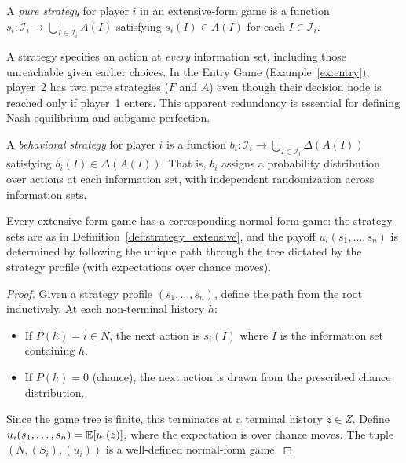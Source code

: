 \documentclass[11pt,a4paper]{article}
\begin{document}
\begin{definition}
\label{def:strategy_extensive}
A \emph{pure strategy} for player $i$ in an extensive-form game is a function
$s_i : \mathcal{I}_i \to \bigcup_{I \in \mathcal{I}_i} A(I)$ satisfying
$s_i(I) \in A(I)$ for each $I \in \mathcal{I}_i$.
\end{definition}

\begin{remark}
\label{rem:contingent}
A strategy specifies an action at \emph{every} information set, including
those unreachable given earlier choices. In the Entry Game
(Example~\ref{ex:entry}), player~2 has two pure strategies ($F$ and $A$)
even though their decision node is reached only if player~1 enters. This
apparent redundancy is essential for defining Nash equilibrium and subgame
perfection.
\end{remark}

\begin{definition}
\label{def:behavioral}
A \emph{behavioral strategy} for player $i$ is a function
$b_i : \mathcal{I}_i \to \bigcup_{I \in \mathcal{I}_i} \Delta(A(I))$
satisfying $b_i(I) \in \Delta(A(I))$. That is, $b_i$ assigns a probability
distribution over actions at each information set, with independent
randomization across information sets.
\end{definition}

\begin{proposition}
\label{prop:normal_form_rep}
Every extensive-form game has a corresponding normal-form game: the strategy
sets are as in Definition~\ref{def:strategy_extensive}, and the payoff
$u_i(s_1, \ldots, s_n)$ is determined by following the unique path through
the tree dictated by the strategy profile (with expectations over chance moves).
\end{proposition}

\begin{proof}
Given a strategy profile $(s_1, \ldots, s_n)$, define the path from the root
inductively. At each non-terminal history $h$:
\begin{itemize}[nosep]
    \item If $P(h) = i \in N$, the next action is $s_i(I)$ where $I$ is the
    information set containing $h$.
    \item If $P(h) = 0$ (chance), the next action is drawn from the
    prescribed chance distribution.
\end{itemize}
Since the game tree is finite, this terminates at a terminal history $z \in Z$.
Define $u_i(s_1, \ldots, s_n) = \mathbb{E}[u_i(z)]$, where the expectation is over
chance moves. The tuple $(N, (S_i), (u_i))$ is a well-defined normal-form
game.
\end{proof}
\end{document}
